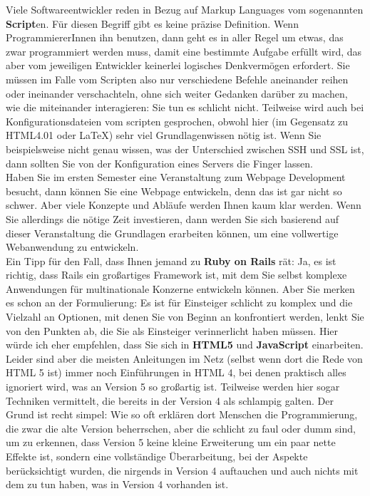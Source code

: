 Viele Softwareentwickler reden in Bezug auf Markup Languages vom sogenannten \textbf{Script}en. Für diesen Begriff gibt es keine präzise Definition. Wenn ProgrammiererInnen ihn benutzen, dann geht es in aller Regel um etwas, das zwar programmiert werden muss, damit eine bestimmte Aufgabe erfüllt wird, das aber vom jeweiligen Entwickler keinerlei logisches Denkvermögen erfordert. Sie müssen im Falle vom Scripten also nur verschiedene Befehle aneinander reihen oder ineinander verschachteln, ohne sich weiter Gedanken darüber zu machen, wie die miteinander interagieren: Sie tun es schlicht nicht. Teilweise wird auch bei Konfigurationsdateien vom scripten gesprochen, obwohl hier (im Gegensatz zu HTML4.01 oder \LaTeX) sehr viel Grundlagenwissen nötig ist. Wenn Sie beispielsweise nicht genau wissen, was der Unterschied zwischen SSH und SSL ist, dann sollten Sie von der Konfiguration eines Servers die Finger lassen.\\

Haben Sie im ersten Semester eine Veranstaltung zum Webpage Development besucht, dann können Sie eine Webpage entwickeln, denn das ist gar nicht so schwer. Aber viele Konzepte und Abläufe werden Ihnen kaum klar werden. Wenn Sie allerdings die nötige Zeit investieren, dann werden Sie sich basierend auf dieser Veranstaltung die Grundlagen erarbeiten können, um eine vollwertige Webanwendung zu entwickeln.\\

Ein Tipp für den Fall, dass Ihnen jemand zu \textbf{Ruby on Rails} rät: Ja, es ist richtig, dass Rails ein großartiges Framework ist, mit dem Sie selbst komplexe Anwendungen für multinationale Konzerne entwickeln können. Aber Sie merken es schon an der Formulierung: Es ist für Einsteiger schlicht zu komplex und die Vielzahl an Optionen, mit denen Sie von Beginn an konfrontiert werden, lenkt Sie von den Punkten ab, die Sie als Einsteiger verinnerlicht haben müssen. Hier würde ich eher empfehlen, dass Sie sich in \textbf{HTML5} und \textbf{JavaScript} einarbeiten. Leider sind aber die meisten Anleitungen im Netz (selbst wenn dort die Rede von HTML 5 ist) immer noch Einführungen in HTML 4, bei denen praktisch alles ignoriert wird, was an Version 5 so großartig ist. Teilweise werden hier sogar Techniken vermittelt, die bereits in der Version 4 als schlampig galten. Der Grund ist recht simpel: Wie so oft erklären dort Menschen die Programmierung, die zwar die alte Version beherrschen, aber die schlicht zu faul oder dumm sind, um zu erkennen, dass Version 5 keine kleine Erweiterung um ein paar nette Effekte ist, sondern eine vollständige Überarbeitung, bei der Aspekte berücksichtigt wurden, die nirgends in Version 4 auftauchen und auch nichts mit dem zu tun haben, was in Version 4 vorhanden ist.\\

